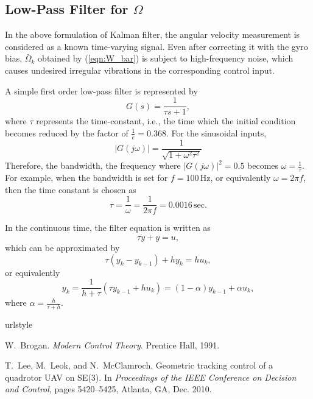 \documentclass[11pt]{article}
\newcommand{\refeqn}[1]{(\ref{eqn:#1})}
\begin{document}
\subsection{Low-Pass Filter for $\Omega$}

In the above formulation of Kalman filter, the angular velocity measurement is considered as a known time-varying signal. Even after correcting it with the gyro bias, $\bar \Omega_k$ obtained by \refeqn{W_bar} is subject to high-frequency noise, which causes undesired irregular vibrations in the corresponding control input. 

A simple first order low-pass filter is represented by
\[
G(s) = \frac{1}{\tau s+ 1},
\]
where $\tau$ represents the time-constant, i.e., the time which the initial condition becomes reduced by the factor of $\frac{1}{e}=0.368$. For the sinusoidal inputs, 
\[
|G(j\omega)| = \frac{1}{\sqrt{1+\omega^2\tau^2}}
\]
Therefore, the bandwidth, the frequency where $|G(j\omega)|^2=0.5$ becomes $\omega=\frac{1}{\tau}$. For example, when the bandwidth is set for $f=100\,\mathrm{Hz}$, or equivalently $\omega=2\pi f$, then the time constant is chosen as
\[
\tau = \frac{1}{\omega} = \frac{1}{2\pi f} = 0.0016 \,\mathrm{sec}.
\]

In the continuous time, the filter equation is written as
\[
\tau \dot y + y = u,
\]
which can be approximated by
\[
\tau (y_{k}-y_{k-1}) +  h y_k = h u_k,
\]
or equivalently
\[
y_k = \frac{1}{h+\tau} ( \tau y_{k-1} + h u_k)=(1-\alpha) y_{k-1} + \alpha u_{k},
\]
where $\alpha=\frac{h}{\tau +h }$. 

\begin{thebibliography}{2}
\providecommand{\natexlab}[1]{#1}
\providecommand{\url}[1]{\texttt{#1}}
\expandafter\ifx\csname urlstyle\endcsname\relax
  \providecommand{\doi}[1]{doi: #1}\else
  \providecommand{\doi}{doi: \begingroup \urlstyle{rm}\Url}\fi

W.~Brogan.
\newblock \emph{Modern Control Theory}.
\newblock Prentice Hall, 1991.

T.~Lee, M.~Leok, and N.~McClamroch.
\newblock Geometric tracking control of a quadrotor {UAV} on {SE(3)}.
\newblock In \emph{Proceedings of the IEEE Conference on Decision and Control},
  pages 5420--5425, Atlanta, GA, Dec. 2010.

\end{thebibliography}




%
%
\end{document}
